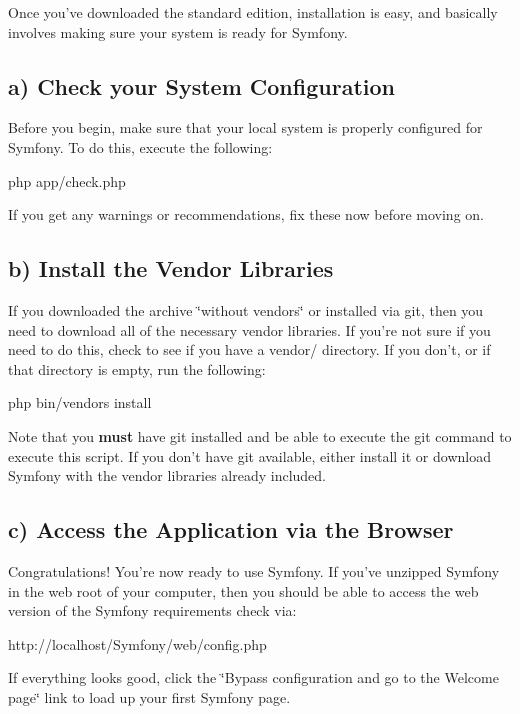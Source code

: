Once you've downloaded the standard edition, installation is easy, and basically involves making sure your system is ready for Symfony.

\subsection*{a) Check your System Configuration}

Before you begin, make sure that your local system is properly configured for Symfony. To do this, execute the following\-: \begin{DoxyVerb}php app/check.php
\end{DoxyVerb}


If you get any warnings or recommendations, fix these now before moving on.

\subsection*{b) Install the Vendor Libraries}

If you downloaded the archive \char`\"{}without vendors\char`\"{} or installed via git, then you need to download all of the necessary vendor libraries. If you're not sure if you need to do this, check to see if you have a {\ttfamily vendor/} directory. If you don't, or if that directory is empty, run the following\-: \begin{DoxyVerb}php bin/vendors install
\end{DoxyVerb}


Note that you {\bfseries must} have git installed and be able to execute the {\ttfamily git} command to execute this script. If you don't have git available, either install it or download Symfony with the vendor libraries already included.

\subsection*{c) Access the Application via the Browser}

Congratulations! You're now ready to use Symfony. If you've unzipped Symfony in the web root of your computer, then you should be able to access the web version of the Symfony requirements check via\-: \begin{DoxyVerb}http://localhost/Symfony/web/config.php
\end{DoxyVerb}


If everything looks good, click the \char`\"{}\-Bypass configuration and go to the Welcome page\char`\"{} link to load up your first Symfony page.

